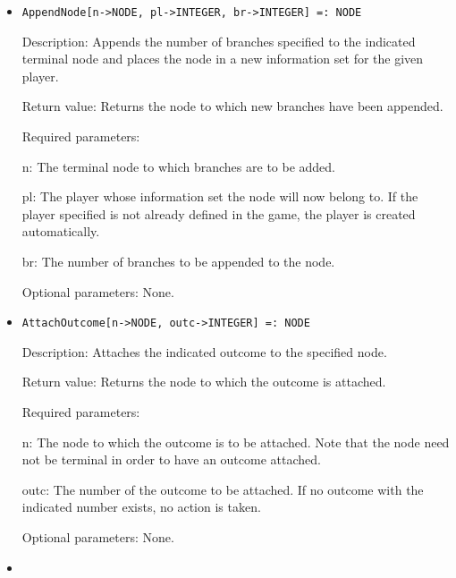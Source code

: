 \begin{itemize}
\item
\protect \large \begin{verbatim}
AppendNode[n->NODE, pl->INTEGER, br->INTEGER] =: NODE
\end{verbatim}
\normalsize

\bd
\item
[Description:] Appends the number of branches specified to the
indicated terminal node and places the node in a new information set
for the given player.
\item
[Return value:] Returns the node to which new branches have been appended.
\item
[Required parameters:]\hfil\null
\par
\bd
\item
[ n:] The terminal node to which branches are to be added.
\item
[ pl:] The player whose information set the node will now belong to.
If the player specified is not already defined in the game, the player
is created automatically. 
\item
[ br:] The number of branches to be appended to the node.
\ed

\item
[Optional parameters:] None.
\ed

\item
\protect \large \begin{verbatim}
AttachOutcome[n->NODE, outc->INTEGER] =: NODE
\end{verbatim}\normalsize

\bd
\item
[Description:] Attaches the indicated outcome to the specified node.
\item
[Return value:] Returns the node to which the outcome is attached.
\item
[Required parameters:]\hfil\null

\bd
\item
[ n:] The node to which the outcome is to be attached.  Note that the
node need not be terminal in order to have an outcome attached.
\item
[ outc:] The number of the outcome to be attached.  If no outcome
with the indicated number exists, no action is taken.  
\ed

\item
[Optional parameters:] None.
\ed

\item


\end{itemize}
